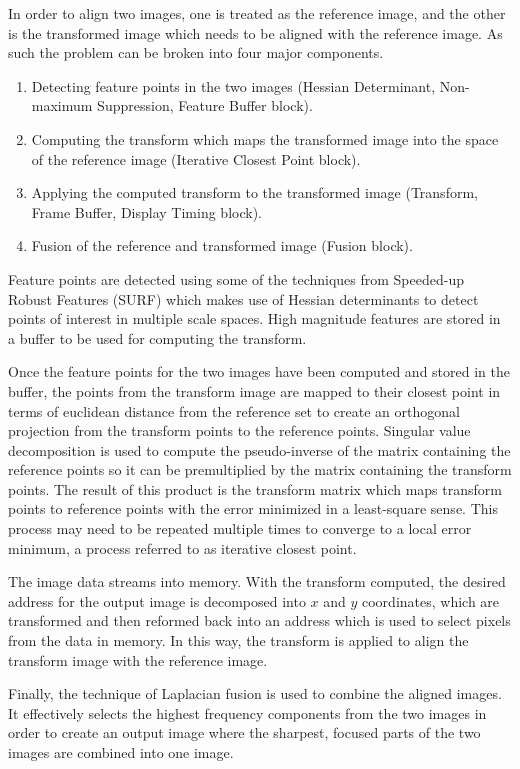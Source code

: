 \documentclass[sigconf]{acmart}
\begin{document}
In order to align two images, one is treated as the reference image, and the other is the transformed image which needs to be aligned with the reference image. As such the problem can be broken into four major components. 

\begin{enumerate}
	\item Detecting feature points in the two images (Hessian Determinant, Non-maximum Suppression, Feature Buffer block).
	\item Computing the transform which maps the transformed image into the space of the reference image (Iterative Closest Point block).
	\item Applying the computed transform to the transformed image (Transform, Frame Buffer, Display Timing block).
	\item Fusion of the reference and transformed image (Fusion block).
\end{enumerate}

Feature points are detected using some of the techniques from Speeded-up Robust Features (SURF) which makes use of Hessian determinants to detect points of interest in multiple scale spaces. High magnitude features are stored in a buffer to be used for computing the transform.

Once the feature points for the two images have been computed and stored in the buffer, the points from the transform image are mapped to their closest point in terms of euclidean distance from the reference set to create an orthogonal projection from the transform points to the reference points. Singular value decomposition is used to compute the pseudo-inverse of the matrix containing the reference points so it can be premultiplied by the matrix containing the transform points. The result of this product is the transform matrix which maps transform points to reference points with the error minimized in a least-square sense. This process may need to be repeated multiple times to converge to a local error minimum, a process referred to as iterative closest point.

The image data streams into memory. With the transform computed, the desired address for the output image is decomposed into $x$ and $y$ coordinates, which are transformed and then reformed back into an address which is used to select pixels from the data in memory. In this way, the transform is applied to align the transform image with the reference image.

Finally, the technique of Laplacian fusion is used to combine the aligned images. It effectively selects the highest frequency components from the two images in order to create an output image where the sharpest, focused parts of the two images are combined into one image.
\end{document}
